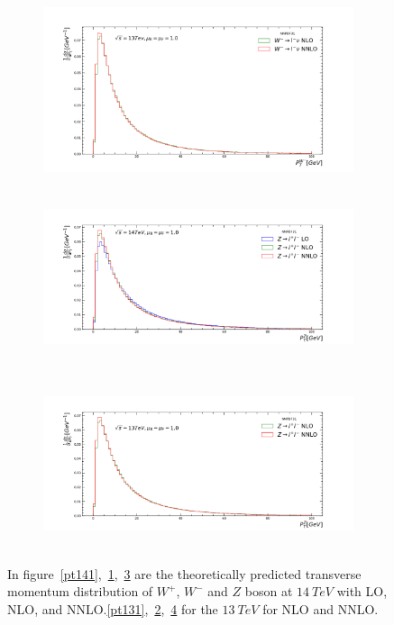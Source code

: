 \begin{figure}[H]
\begin{subfigure}{0.49\textwidth}
\vspace*{-8mm}
\caption{}
\label{pt142}
\end{subfigure}
\begin{subfigure}{0.49\textwidth}
\includegraphics[height=5cm, width=\textwidth]{chapter4/Wmpt_rf1_13.pdf}
\vspace*{-8mm}
\caption{}
\label{pt132}
\end{subfigure}
\begin{subfigure}{0.49\textwidth}
\includegraphics[height=5cm, width=\textwidth]{chapter4/Zpt_rf1_14.pdf}
\vspace*{-8mm}
\caption{}
\label{pt143}
\end{subfigure}
\begin{subfigure}{0.49\textwidth}
\includegraphics[height=5cm, width=\textwidth]{chapter4/Zpt_rf1_13.pdf}
\vspace*{-8mm}
\caption{}
\label{pt133}
\end{subfigure}
\caption{In figure~\ref{pt141},~\ref{pt142},~\ref{pt143} are the theoretically predicted transverse momentum distribution of $W^{+}$, $W^{-}$ and $Z$ boson at $14~TeV$ with LO, NLO, and NNLO.\ref{pt131},~\ref{pt132},~\ref{pt133} for the $13~TeV$ for NLO and NNLO.}  
\label{dist}
\end{figure}

